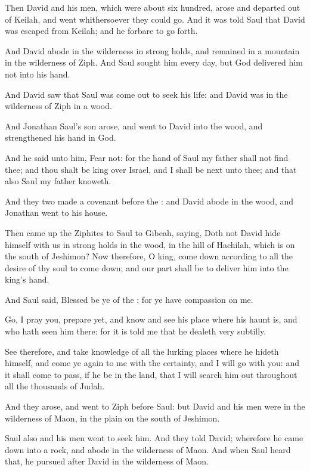 \verse Then David and his men, which were about six hundred, arose and departed out of Keilah, and went whithersoever they could go. And it was told Saul that David was escaped from Keilah; and he forbare to go forth.

\verse And David abode in the wilderness in strong holds, and remained in a mountain in the wilderness of Ziph. And Saul sought him every day, but God delivered him not into his hand.

\verse And David saw that Saul was come out to seek his life: and David was in the wilderness of Ziph in a wood.

\verse And Jonathan Saul's son arose, and went to David into the wood, and strengthened his hand in God.

\verse And he said unto him, Fear not: for the hand of Saul my father shall not find thee; and thou shalt be king over Israel, and I shall be next unto thee; and that also Saul my father knoweth.

\verse And they two made a covenant before the \LORD: and David abode in the wood, and Jonathan went to his house.

\verse Then came up the Ziphites to Saul to Gibeah, saying, Doth not David hide himself with us in strong holds in the wood, in the hill of Hachilah, which is on the south of Jeshimon?  \verse Now therefore, O king, come down according to all the desire of thy soul to come down; and our part shall be to deliver him into the king's hand.

\verse And Saul said, Blessed be ye of the \LORD; for ye have compassion on me.

\verse Go, I pray you, prepare yet, and know and see his place where his haunt is, and who hath seen him there: for it is told me that he dealeth very subtilly.

\verse See therefore, and take knowledge of all the lurking places where he hideth himself, and come ye again to me with the certainty, and I will go with you: and it shall come to pass, if he be in the land, that I will search him out throughout all the thousands of Judah.

\verse And they arose, and went to Ziph before Saul: but David and his men were in the wilderness of Maon, in the plain on the south of Jeshimon.

\verse Saul also and his men went to seek him. And they told David; wherefore he came down into a rock, and abode in the wilderness of Maon. And when Saul heard that, he pursued after David in the wilderness of Maon.

